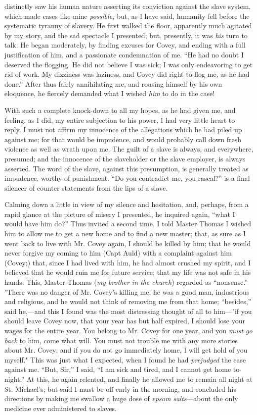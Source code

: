 distinctly saw his human nature asserting its conviction against the
slave system, which made cases like mine \emph{possible;} but, as I have
said, humanity fell before the systematic tyranny of slavery. He first
walked the floor, apparently much agitated by my story, and the sad
spectacle I presented; but, presently, it was \emph{his} turn to talk.
He began moderately, by finding excuses for Covey, and ending with a
full justification of him, and a passionate condemnation of me. ``He had
no doubt I deserved the flogging. He did not believe I was sick; I was
only endeavoring to get rid of work. My dizziness was laziness, and
Covey did right to flog me, as he had done.'' After thus fairly
annihilating me, and rousing himself by his own eloquence, {}he fiercely
demanded what I wished \emph{him} to do in the case!

With such a complete knock-down to all my hopes, as he had given me, and
feeling, as I did, my entire subjection to his power, I had very little
heart to reply. I must not affirm my innocence of the allegations which
he had piled up against me; for that would be impudence, and would
probably call down fresh violence as well as wrath upon me. The guilt of
a slave is always, and everywhere, presumed; and the innocence of the
slaveholder or the slave employer, is always asserted. The word of the
slave, against this presumption, is generally treated as impudence,
worthy of punishment. ``Do you contradict me, you rascal?'' is a final
silencer of counter statements from the lips of a slave.

Calming down a little in view of my silence and hesitation, and,
perhaps, from a rapid glance at the picture of misery I presented, he
inquired again, ``what I would have him do?'' Thus invited a second
time, I told Master Thomas I wished him to allow me to get a new home
and to find a new master; that, as sure as I went back to live with Mr.
Covey again, I should be killed by him; that he would never forgive my
coming to him (Capt Auld) with a complaint against him (Covey;) that,
since I had lived with him, he had almost crushed my spirit, and I
believed that he would ruin me for future service; that my life was not
safe in his hands. This, Master Thomas (\emph{my brother in the church})
regarded as ``nonsense.'' "There was no danger of Mr. Covey's killing
me; he was a good man, industrious and religious, {}and he would not
think of removing me from that home; ``besides,'' said he,---and this I
found was the most distressing thought of all to him---"if you should
leave Covey now, that your year has but half expired, I should lose your
wages for the entire year. You belong to Mr. Covey for one year, and you
\emph{must go back} to him, come what will. You must not trouble me with
any more stories about Mr. Covey; and if you do not go immediately home,
I will get hold of you myself." This was just what I expected, when I
found he had \emph{prejudged} the case against me. ``But, Sir,'' I said,
``I am sick and tired, and I cannot get home to-night.'' At this, he
again relented, and finally he allowed me to remain all night at St.
Michael's; but said I must be off early in the morning, and concluded
his directions by making me swallow a huge dose of \emph{epsom
salts}---about the only medicine ever administered to slaves.

